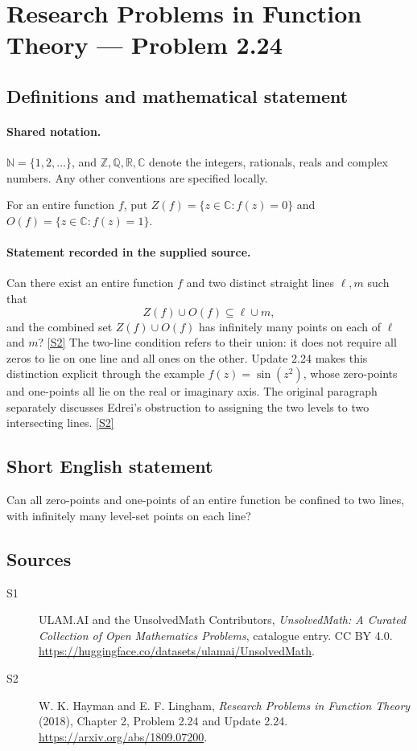 \documentclass[11pt]{article}
\newcommand{\sref}[2]{\hyperlink{source:#1:#2}{[S#2]}}
\begin{document}
\section{Research Problems in Function Theory — Problem 2.24}\label{statement}

\subsection{Definitions and mathematical statement}

\paragraph{Shared notation.}$\mathbb N=\{1,2,\ldots\}$, and $\mathbb Z,\mathbb Q,\mathbb R,\mathbb C$ denote the integers, rationals, reals and complex numbers. Any other conventions are specified locally.


For an entire function $f$, put $Z(f)=\{z\in\mathbb C:f(z)=0\}$ and $O(f)=\{z\in\mathbb C:f(z)=1\}$.

\paragraph{Statement recorded in the supplied source.}
Can there exist an entire function $f$ and two distinct straight lines $\ell,m$ such that
\[Z(f)\cup O(f)\subseteq\ell\cup m,\]
and the combined set $Z(f)\cup O(f)$ has infinitely many points on each of $\ell$ and $m$? \sref{statement}{2}
The two-line condition refers to their union: it does not require all zeros to lie on one line and all ones on the other. Update 2.24 makes this distinction explicit through the example $f(z)=\sin(z^2)$, whose zero-points and one-points all lie on the real or imaginary axis. The original paragraph separately discusses Edrei's obstruction to assigning the two levels to two intersecting lines. \sref{statement}{2}
\subsection{Short English statement}
Can all zero-points and one-points of an entire function be confined to two lines, with infinitely many level-set points on each line?
\subsection{Sources}
\begin{description}
\item[\hypertarget{source:statement:1}{S1}] ULAM.AI and the UnsolvedMath Contributors, \emph{UnsolvedMath: A Curated Collection of Open Mathematics Problems}, catalogue entry. CC BY 4.0. \url{https://huggingface.co/datasets/ulamai/UnsolvedMath}.
\item[\hypertarget{source:statement:2}{S2}] W. K. Hayman and E. F. Lingham, \emph{Research Problems in Function Theory} (2018), Chapter 2, Problem 2.24 and Update 2.24. \url{https://arxiv.org/abs/1809.07200}.
\end{description}
\label{end:statement}
\end{document}
